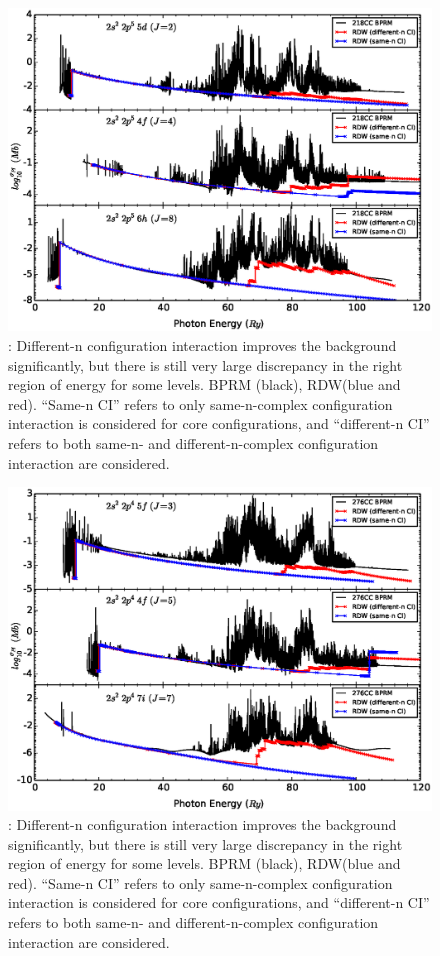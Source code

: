 \begin{figure}
	\centering
	\includegraphics[width=.9\textwidth]{figures/fe17_discrepancy.eps}
	\caption{: Different-n configuration interaction improves the background significantly, but there is still very large discrepancy in the right region of energy for some levels. BPRM (black), RDW(blue and red). ``Same-n CI'' refers to only same-n-complex configuration interaction is considered for core configurations, and ``different-n CI'' refers to both same-n- and different-n-complex configuration interaction are considered.}
	\label{fig_fe17_discrepancy}
\end{figure}

\begin{figure}
	\centering
	\includegraphics[width=.9\textwidth]{figures/fe18_discrepancy.eps}
	\caption{: Different-n configuration interaction improves the background significantly, but there is still very large discrepancy in the right region of energy for some levels. BPRM (black), RDW(blue and red). ``Same-n CI'' refers to only same-n-complex configuration interaction is considered for core configurations, and ``different-n CI'' refers to both same-n- and different-n-complex configuration interaction are considered.}
	\label{fig_fe18_discrepancy}
\end{figure}

